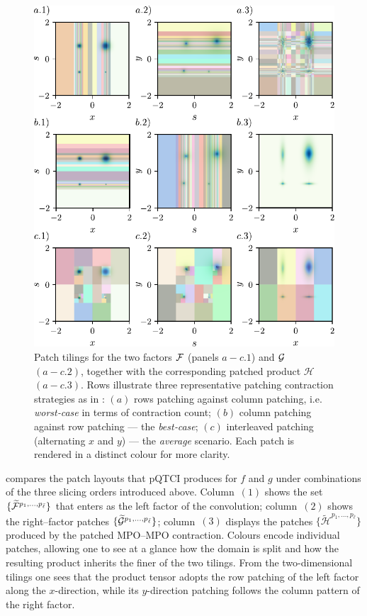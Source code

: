 \begin{figure}[htbp]
    \centering
    \includegraphics{figures/PatchContrResults.pdf}
    \caption{Patch tilings for the two factors \(\mathcal{F}\) (panels
    $a-c.1$) and \(\mathcal{G}\) $(a-c.2)$, together with the corresponding
    patched product \(\mathcal H\) $(a-c.3)$. Rows illustrate three representative patching contraction strategies as in : $(a)$ rows patching against column patching, i.e. \emph{worst‐case} in terms of contraction count;
    $(b)$ column patching against row patching — the \emph{best‐case};
   $(c)$ interleaved patching (alternating \(x\) and \(y\)) — the
    \emph{average} scenario. Each patch is rendered in a distinct colour for more clarity.}
    \label{fig:patchingPatternsMatMul}
\end{figure}

 compares the patch layouts that pQTCI produces for \(f\) and \(g\) under combinations of the three slicing orders introduced above.  
Column~$(1)$ shows the set \(\{\widetilde{\mathcal{F}}^{p_{1},\dots,p_{\bar\ell}}\}\) that enters as the left factor of the convolution; column~$(2)$ shows the right–factor patches
\(\{\widetilde{\mathcal{G}}^{p_{1},\dots,p_{\bar\ell}}\}\); column~$(3)$ displays the patches \(\{\widetilde{\mathcal H}^{p_{1},\dots,p_{\bar\ell}}\}\) produced by the patched MPO–MPO contraction. Colours encode individual patches, allowing one to see at a glance how the
domain is split and how the resulting product inherits the finer of the two tilings. From the two-dimensional tilings one sees that the product tensor adopts the row patching of the left factor along the $x$-direction, while its $y$-direction patching follows the column pattern of the right factor.


